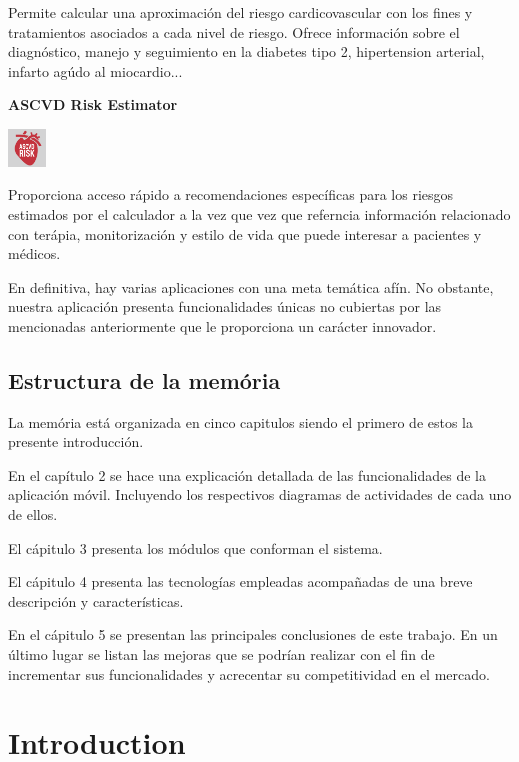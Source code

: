 \documentclass[11pt,spanish,
		listoftables,listoffigures]
		{tfgplantilla}
\begin{document}
\noindent
Permite calcular una aproximación del riesgo cardicovascular con los fines y tratamientos asociados a cada nivel de riesgo. Ofrece información sobre el diagnóstico, manejo y seguimiento en la diabetes tipo 2, hipertension arterial, infarto agúdo al miocardio...

\noindent
\textbf {ASCVD Risk Estimator}

\noindent
\includegraphics[height=1cm]{ASCVD_icon.jpg}

\noindent
Proporciona acceso rápido a recomendaciones específicas para los riesgos estimados por el calculador a la vez que vez que referncia información relacionado con terápia, monitorización y estilo de vida que puede interesar a pacientes y médicos.

En definitiva, hay varias aplicaciones con una meta temática afín. No obstante, nuestra aplicación presenta funcionalidades únicas no cubiertas por las mencionadas anteriormente que le proporciona un carácter innovador. 

\section{Estructura de la mem\'oria}

La memória está organizada en cinco capitulos siendo el primero de estos la presente introducción.

En el capítulo 2 se hace una explicación detallada de las funcionalidades de la aplicación móvil. Incluyendo los respectivos diagramas de actividades de cada uno de ellos.

El cápitulo 3 presenta los módulos que conforman el sistema.

El cápitulo 4 presenta las tecnologías empleadas acompañadas de una breve descripción y características.

En el cápitulo 5 se presentan las principales conclusiones de este trabajo. En un último lugar se listan las mejoras que se podrían realizar con el fin de incrementar sus funcionalidades y acrecentar su competitividad en el mercado.

\addtocounter{chapter}{-1}
\chapter{Introduction}
\end{document}
